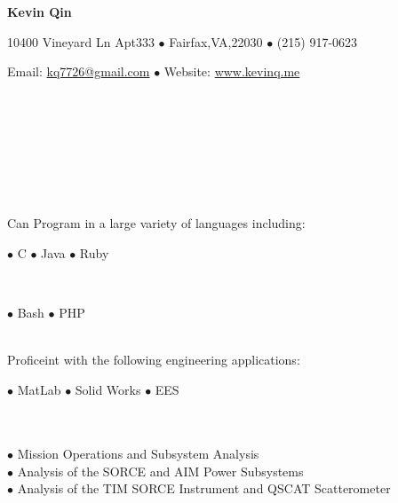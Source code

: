 \documentclass[11pt]{article} %
\begin{document}
\centerline{\Large \bf Kevin Qin} %
\centerline{10400 Vineyard Ln Apt333 $\bullet$ Fairfax,VA,22030 $\bullet$ (215) 917-0623}
\centerline{Email: \href{mailto:kq7726@gmail.com}{kq7726@gmail.com} $\bullet$ Website: \href{http://www.kevinq.me}{www.kevinq.me}}
\noindent\hrulefill\\
\smallskip\\
 \\%
\smallskip\\ %
\noindent\\ %
\bigskip\\ %
\smallskip\\
\noindent Can Program in a large variety of languages including: \\ %
\centerline{$\bullet$ C $\bullet$ Java $\bullet$ Ruby}\\
\centerline{\hfill $\bullet$ Bash \hfill $\bullet$ PHP \hfill}\\
Proficeint with the following engineering applications: \\
\centerline{\hfill $\bullet$ MatLab \hfill $\bullet$ Solid Works \hfill $\bullet$ EES \hfill}\\
\\
\smallskip
{}
\indent$\bullet$ Mission Operations and Subsystem Analysis\\
$\bullet$ Analysis of the SORCE and AIM Power Subsystems\\
$\bullet$ Analysis of the TIM SORCE Instrument and QSCAT Scatterometer\\
\bigskip
\end{document}
